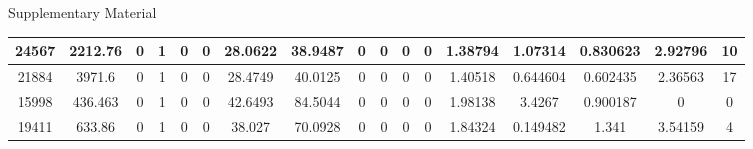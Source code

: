 \begin{wcfChaps}{Supplementary Material}
\begin{sidewaystable}
{\begin{tabular}{|c|c|c|c|c|c|c|c|c|c|c|c|c|c|c|c|c|}
24567 & 2212.76 & 0 & 1 & 0 & 0 & 28.0622 & 38.9487 & 0 & 0 & 0 & 0 & 1.38794 & 1.07314 & 0.830623 & 2.92796 & 10 \\\hline
21884 & 3971.6 & 0 & 1 & 0 & 0 & 28.4749 & 40.0125 & 0 & 0 & 0 & 0 & 1.40518 & 0.644604 & 0.602435 & 2.36563 & 17 \\\hline
15998 & 436.463 & 0 & 1 & 0 & 0 & 42.6493 & 84.5044 & 0 & 0 & 0 & 0 & 1.98138 & 3.4267 & 0.900187 & 0 & 0 \\\hline
19411 & 633.86 & 0 & 1 & 0 & 0 & 38.027 & 70.0928 & 0 & 0 & 0 & 0 & 1.84324 & 0.149482 & 1.341 & 3.54159 & 4 \\\hline


\end{tabular}}
\end{sidewaystable}
\end{wcfChaps}
